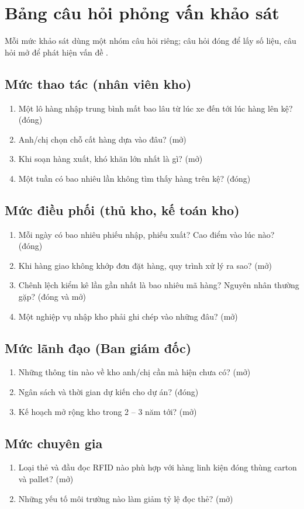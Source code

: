 \chapter{Bảng câu hỏi phỏng vấn khảo sát}
\label{app:cauhoi}

Mỗi mức khảo sát dùng một nhóm câu hỏi riêng; câu hỏi đóng để lấy số liệu, câu hỏi mở để phát hiện vấn đề \cite[Ch.~4]{tung_qlhttt}.

\section*{Mức thao tác (nhân viên kho)}
\begin{enumerate}
  \item Một lô hàng nhập trung bình mất bao lâu từ lúc xe đến tới lúc hàng lên kệ? (đóng)
  \item Anh/chị chọn chỗ cất hàng dựa vào đâu? (mở)
  \item Khi soạn hàng xuất, khó khăn lớn nhất là gì? (mở)
  \item Một tuần có bao nhiêu lần không tìm thấy hàng trên kệ? (đóng)
\end{enumerate}

\section*{Mức điều phối (thủ kho, kế toán kho)}
\begin{enumerate}
  \item Mỗi ngày có bao nhiêu phiếu nhập, phiếu xuất? Cao điểm vào lúc nào? (đóng)
  \item Khi hàng giao không khớp đơn đặt hàng, quy trình xử lý ra sao? (mở)
  \item Chênh lệch kiểm kê lần gần nhất là bao nhiêu mã hàng? Nguyên nhân thường gặp? (đóng và mở)
  \item Một nghiệp vụ nhập kho phải ghi chép vào những đâu? (mở)
\end{enumerate}

\section*{Mức lãnh đạo (Ban giám đốc)}
\begin{enumerate}
  \item Những thông tin nào về kho anh/chị cần mà hiện chưa có? (mở)
  \item Ngân sách và thời gian dự kiến cho dự án? (đóng)
  \item Kế hoạch mở rộng kho trong 2 -- 3 năm tới? (mở)
\end{enumerate}

\section*{Mức chuyên gia}
\begin{enumerate}
  \item Loại thẻ và đầu đọc RFID nào phù hợp với hàng linh kiện đóng thùng carton và pallet? (mở)
  \item Những yếu tố môi trường nào làm giảm tỷ lệ đọc thẻ? (mở)
\end{enumerate}
